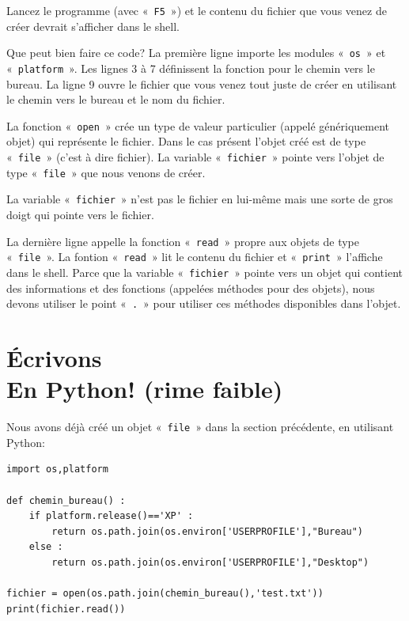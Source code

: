 Lancez le programme (avec «~\texttt{F5}~») et le contenu du fichier que vous venez de créer devrait s'afficher dans le shell. 

Que peut bien faire ce code? La première ligne importe les modules «~\texttt{os}~»  et «~\texttt{platform}~». Les lignes 3 à 7 définissent la fonction pour le chemin vers le bureau.
La ligne 9 ouvre le fichier que vous venez tout juste de créer en utilisant le chemin vers le bureau et le nom du fichier.

La fonction «~\texttt{open}~»  crée un type de valeur particulier (appelé génériquement objet) qui représente le fichier. Dans le cas présent l'objet créé est de type «~\texttt{file}~» (c'est à dire fichier). La variable «~\texttt{fichier}~» pointe vers l'objet de type «~\texttt{file}~» que nous venons de créer.

La variable «~\texttt{fichier}~» n'est pas le fichier en lui-même mais une sorte de gros doigt qui pointe vers le fichier.

La dernière ligne appelle la fonction «~\texttt{read}~» propre aux objets de type «~\texttt{file}~». La fontion «~\texttt{read}~» lit le contenu du fichier et «~\texttt{print}~» l'affiche dans le shell. Parce que la variable «~\texttt{fichier}~» pointe vers un objet qui contient des informations et des fonctions (appelées méthodes pour des objets), nous devons utiliser le point «~\texttt{.}~»  pour utiliser ces méthodes disponibles dans l'objet.

\begin{center}
\end{center}

\section{Écrivons\\
En Python! (rime faible)}

Nous avons déjà créé un objet «~\texttt{file}~» dans la section précédente, en utilisant Python:

\begin{Verbatim}[frame=single,rulecolor=\color{gray}, label=ne pas saisir]
import os,platform

def chemin_bureau() :
    if platform.release()=='XP' :
        return os.path.join(os.environ['USERPROFILE'],"Bureau")
    else :
        return os.path.join(os.environ['USERPROFILE'],"Desktop")
    
fichier = open(os.path.join(chemin_bureau(),'test.txt'))
print(fichier.read())
\end{Verbatim}

